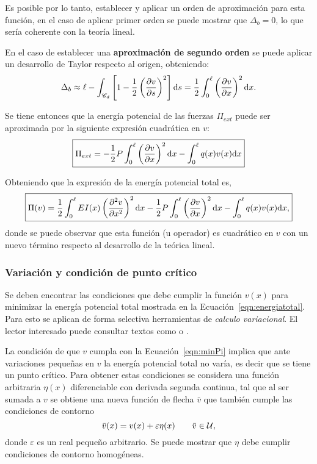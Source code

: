 Es posible por lo tanto, establecer y aplicar un orden de aproximación para esta función, en el caso de aplicar primer orden se puede mostrar que $\Delta_b=0$, lo que sería coherente con la teoría lineal. %
%

En el caso de establecer una \textbf{aproximación de segundo orden} se puede aplicar un desarrollo de Taylor respecto al origen, obteniendo:
%
\begin{equation}\label{eqn:deltab}
\Delta_b \approx \ell - \int_{\mathscr{C}_d} \left[1 - \frac{1}{2}\left(\frac{\partial v}{\partial s}\right)^2\right] {\text{d}} s = \frac{1}{2} \int_0^\ell \left(\frac{\partial v}{\partial x}\right)^2 {\text{d}} x.
\end{equation}

Se tiene entonces que la energía potencial de las fuerzas $\Pi_{ext}$ puede ser aproximada por la siguiente expresión cuadrática en $v$:
%
\begin{equation}
\boxed{
\Pi_{ext} = -\frac{1}{2} P \int_0^\ell  \left(\frac{\partial v}{\partial x}\right)^2 {\text{d}} x - \int_0^\ell q(x) v(x) {\text{d}} x
}
\end{equation}

Obteniendo que la expresión de la energía potencial total es,
%
\begin{equation}\label{eqn:energiatotal}
\boxed{
\Pi(v) =  \frac{1}{2} \int_0^\ell EI(x) \left( \frac{\partial^2 v}{\partial x^2}\right)^2 {\text{d}} x -\frac{1}{2} P \int_0^\ell  \left(\frac{\partial v}{\partial x}\right)^2 {\text{d}} x - \int_0^\ell q(x) v(x) {\text{d}} x,
}
\end{equation}
donde se puede observar que esta función (u operador) es cuadrático en $v$ con un nuevo término respecto al desarrollo de la teórica lineal.

\subsubsection{Variación y condición de punto crítico}

Se deben encontrar las condiciones que debe cumplir la función $v(x)$ para minimizar la energía potencial total mostrada en la Ecuación~\ref{eqn:energiatotal}. %
%
Para esto se aplican de forma selectiva herramientas de \textit{calculo variacional}. El lector interesado puede consultar textos como \citep{Reddy2002b} o \citep{Taroco2019}.

La condición de que $v$ cumpla con la Ecuación~\ref{eqn:minPi} implica que ante variaciones pequeñas en $v$ la energía potencial total no varía, es decir que se tiene un punto crítico. %
%
Para obtener estas condiciones se considera una función arbitraria $\eta(x)$ diferenciable con derivada segunda continua, tal que al ser sumada a $v$ se obtiene una nueva función de flecha $\bar{v}$ que también cumple las condiciones de contorno
%
\begin{equation}\label{eqn:funcionv}
\bar{v}(x)=v(x)+\varepsilon\eta(x) \qquad \bar{v}\in {\mathcal U},
\end{equation}
donde $\varepsilon$ es un real pequeño arbitrario. %
%
Se puede mostrar que $\eta$ debe cumplir condiciones de contorno homogéneas.

